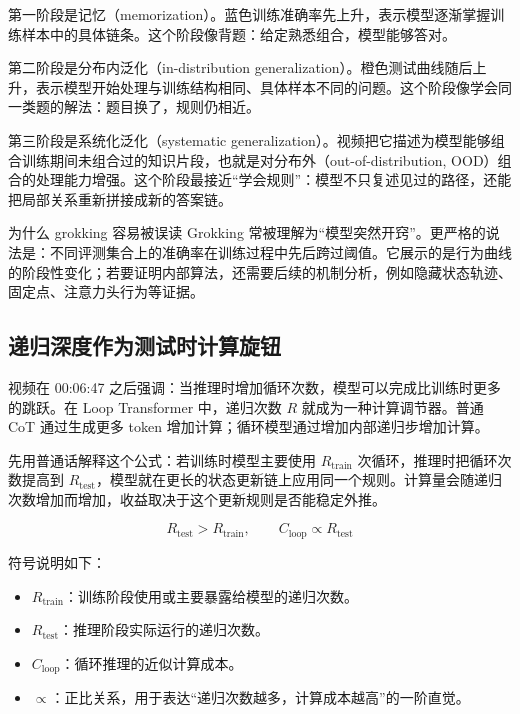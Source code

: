 第一阶段是记忆（memorization）。蓝色训练准确率先上升，表示模型逐渐掌握训练样本中的具体链条。这个阶段像背题：给定熟悉组合，模型能够答对。

第二阶段是分布内泛化（in-distribution generalization）。橙色测试曲线随后上升，表示模型开始处理与训练结构相同、具体样本不同的问题。这个阶段像学会同一类题的解法：题目换了，规则仍相近。

第三阶段是系统化泛化（systematic generalization）。视频把它描述为模型能够组合训练期间未组合过的知识片段，也就是对分布外（out-of-distribution, OOD）组合的处理能力增强。这个阶段最接近“学会规则”：模型不只复述见过的路径，还能把局部关系重新拼接成新的答案链。

\begin{knowledgebox}{为什么 grokking 容易被误读}
Grokking 常被理解为“模型突然开窍”。更严格的说法是：不同评测集合上的准确率在训练过程中先后跨过阈值。它展示的是行为曲线的阶段性变化；若要证明内部算法，还需要后续的机制分析，例如隐藏状态轨迹、固定点、注意力头行为等证据。
\end{knowledgebox}

\subsection{递归深度作为测试时计算旋钮}

视频在 00:06:47 之后强调：当推理时增加循环次数，模型可以完成比训练时更多的跳跃。在 Loop Transformer 中，递归次数 \(R\) 就成为一种计算调节器。普通 CoT 通过生成更多 token 增加计算；循环模型通过增加内部递归步增加计算。

先用普通话解释这个公式：若训练时模型主要使用 \(R_{\mathrm{train}}\) 次循环，推理时把循环次数提高到 \(R_{\mathrm{test}}\)，模型就在更长的状态更新链上应用同一个规则。计算量会随递归次数增加而增加，收益取决于这个更新规则是否能稳定外推。

$$
R_{\mathrm{test}}>R_{\mathrm{train}},\qquad C_{\mathrm{loop}}\propto R_{\mathrm{test}}
$$

符号说明如下：
\begin{itemize}
    \item \(R_{\mathrm{train}}\)：训练阶段使用或主要暴露给模型的递归次数。
    \item \(R_{\mathrm{test}}\)：推理阶段实际运行的递归次数。
    \item \(C_{\mathrm{loop}}\)：循环推理的近似计算成本。
    \item \(\propto\)：正比关系，用于表达“递归次数越多，计算成本越高”的一阶直觉。
\end{itemize}

